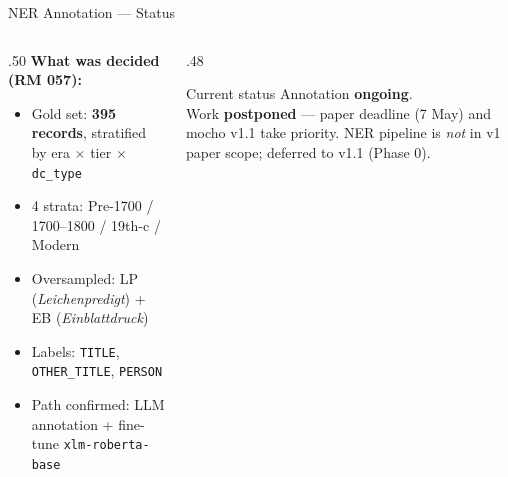 \documentclass[xcolor,aspectratio=169,compress]{beamer}
\begin{document}
\begin{frame}{NER Annotation --- Status}
  \small
  \begin{columns}[t]
    \begin{column}{.50\textwidth}
      \textbf{What was decided (RM 057):}
      \begin{itemize}\setlength{\itemsep}{2pt}
        \item Gold set: \textbf{395 records}, stratified by era $\times$ tier $\times$ \texttt{dc\_type}
        \item 4 strata: Pre-1700 / 1700--1800 / 19th-c / Modern
        \item Oversampled: LP (\textit{Leichenpredigt}) + EB (\textit{Einblattdruck})
        \item Labels: \texttt{TITLE}, \texttt{OTHER\_TITLE}, \texttt{PERSON}
        \item Path confirmed: LLM annotation + fine-tune \texttt{xlm-roberta-base}
      \end{itemize}
    \end{column}
    \begin{column}{.48\textwidth}
      \begin{alertblock}{Current status}
        Annotation \textbf{ongoing}. \\[3pt]
        Work \textbf{postponed} --- paper deadline (7 May) and mocho v1.1
        take priority. NER pipeline is \emph{not} in v1 paper scope;
        deferred to v1.1 (Phase 0).
      \end{alertblock}
    \end{column}
  \end{columns}
\end{frame}
\end{document}
